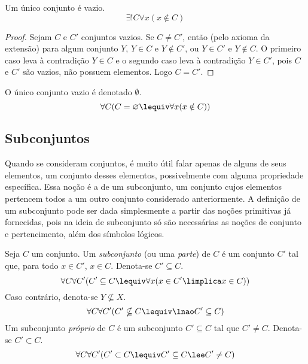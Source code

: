 \begin{prop}
Um único conjunto é vazio.
	\begin{equation*}
	\exists! C \forall x(x \notin C)
	\end{equation*}
\end{prop}
\begin{proof}
Sejam $C$ e $C'$ conjuntos vazios. Se $C \neq C'$, então (pelo axioma da extensão) para algum conjunto $Y$, $Y \in C$ e $Y \notin C'$, ou $Y \in C'$ e $Y \notin C$. O primeiro caso leva à contradição $Y \in C$ e o segundo caso leva à contradição $Y \in C'$, pois $C$ e $C'$ são vazios, não possuem elementos. Logo $C = C'$.
\end{proof}

\begin{defi}
O único conjunto vazio é denotado $\emptyset$.
	\begin{equation*}
	\forall C(C=\emptyset \lequiv \forall x(x \notin C))
	\end{equation*}
\end{defi}

\subsection{Subconjuntos}

Quando se consideram conjuntos, é muito útil falar apenas de alguns de seus elementos, um conjunto desses elementos, possivelmente com alguma propriedade específica. Essa noção é a de um subconjunto, um conjunto cujos elementos pertencem todos a um outro conjunto considerado anteriormente. A definição de um subconjunto pode ser dada simplesmente a partir das noções primitivas já fornecidas, pois na ideia de subconjunto só são necessárias as noções de conjunto e pertencimento, além dos símbolos lógicos.

\begin{defi}
Seja $C$ um conjunto. Um \emph{subconjunto} (ou uma \emph{parte}) de $C$ é um conjunto $C'$ tal que, para todo $x \in C'$, $x \in C$. Denota-se $C' \subseteq C$.
	\begin{equation*}
	\forall C \forall C' (C' \subseteq C \lequiv \forall x (x \in C' \limplica x \in C))
	\end{equation*}
Caso contrário, denota-se $Y \nsubseteq X$.
	\begin{equation*}
	\forall C \forall C' (C' \nsubseteq C \lequiv \lnao C' \subseteq C)
	\end{equation*}
Um subconjunto \emph{próprio} de $C$ é um subconjunto $C' \subseteq C$ tal que $C' \neq C$. Denota-se $C' \subset C$.
	\begin{equation*}
	\forall C \forall C' (C' \subset C \lequiv C' \subseteq C \lee C' \neq C)
	\end{equation*}
\end{defi}

